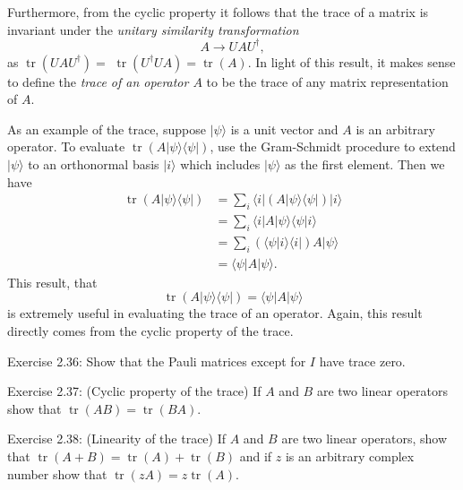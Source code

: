 Furthermore, from the cyclic property it follows that the trace of a matrix is invariant under the \textit{unitary similarity transformation} 
$$A \rightarrow U A U^{\dagger},$$
as $\operatorname{tr}\left(U A U^{\dagger}\right)=$ $\operatorname{tr}\left(U^{\dagger} U A\right)=\operatorname{tr}(A)$. In light of this result, it makes sense to define the \textit{trace of an operator $A$} to be the trace of any matrix representation of $A$.

As an example of the trace, suppose $|\psi\rangle$ is a unit vector and $A$ is an arbitrary operator. To evaluate $\operatorname{tr}(A|\psi\rangle\langle\psi|)$, use the Gram-Schmidt procedure to extend $|\psi\rangle$ to an orthonormal basis $|i\rangle$ which includes $|\psi\rangle$ as the first element. Then we have
$$
\begin{aligned}
\operatorname{tr}(A|\psi\rangle\langle\psi|) 
& =\sum_{i}\langle i| \left(A| \psi\rangle\langle\psi | \right) | i\rangle \\
& =\sum_{i}\langle i| A| \psi\rangle\langle\psi |  i\rangle \\
& =\sum_{i}\left(\langle\psi |  i\rangle\langle i| \right) A| \psi\rangle \\
& =\langle\psi|A| \psi\rangle.
\end{aligned}
$$
This result, that 
$$
\operatorname{tr}(A|\psi\rangle\langle\psi|)=\langle\psi|A| \psi\rangle
$$
is extremely useful in evaluating the trace of an operator. Again, this result directly comes from the cyclic property of the trace.


\begin{exercise}
Exercise 2.36: Show that the Pauli matrices except for $I$ have trace zero.
\end{exercise}

\begin{exercise}
Exercise 2.37: (Cyclic property of the trace) If $A$ and $B$ are two linear operators show that $\operatorname{tr}(A B)=\operatorname{tr}(B A).$
\end{exercise}

\begin{exercise}
Exercise 2.38: (Linearity of the trace) If $A$ and $B$ are two linear operators, show that $\operatorname{tr}(A+B)=\operatorname{tr}(A)+\operatorname{tr}(B)$ and if $z$ is an arbitrary complex number show that $\operatorname{tr}(z A)=z \operatorname{tr}(A)$.
\end{exercise}

